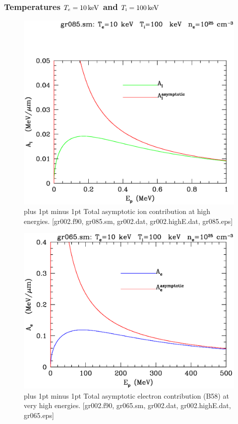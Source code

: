 \documentclass[preprint,12pt,eqsecnum,nofootinbib,amsmath,amssymb]{revtex4}
\newcommand{\smI}{{\rm\scriptscriptstyle I}}
\newcommand{\footnoteskip}{\baselineskip 12pt plus 1pt minus 1pt}
\begin{document}
\vfill

\pagebreak
\subsubsection{Temperatures $T_e=10\,{\rm keV}$ and $T_\smI=100\,{\rm keV}$}

\vskip-2cm 
\begin{figure}[h!]
\includegraphics[scale=0.45]{gr085.eps} 
\vskip-0.8cm 
\caption{\footnoteskip  
  Total asymptotic ion contribution at high energies. [gr002.f90,
  gr085.sm, gr002.dat, gr002.highE.dat, gr085.eps]
}
\label{fig:gr085}
\end{figure}


\vskip-2cm 
\begin{figure}[h!]
\includegraphics[scale=0.45]{gr065.eps}
\vskip-0.8cm 
\caption{\footnoteskip  
  Total asymptotic electron contribution (B58) at very high
  energies. [gr002.f90, gr065.sm, gr002.dat,
  gr002.highE.dat, gr065.eps]
}
\label{fig:gr065}
\end{figure}
\end{document}
